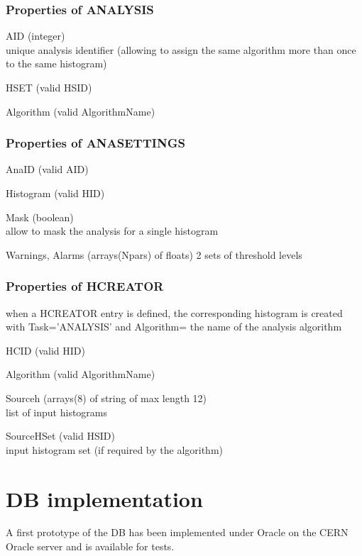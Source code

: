 \documentclass{lhcbnote}
\begin{document}
\subsubsection{Properties of ANALYSIS}
\begin{description}
\item{AID} (integer)\\
unique analysis identifier (allowing to assign the same algorithm more
than once to the same histogram)
\item{HSET}  (valid HSID)
\item{Algorithm}  (valid AlgorithmName)
\end{description}

\subsubsection{Properties of ANASETTINGS}
\begin{description}
\item{AnaID} (valid AID)
\item{Histogram}  (valid HID)
\item{Mask} (boolean)\\
allow to mask the analysis for a single histogram
\item{Warnings, Alarms} (arrays(Npars) of floats)
2 sets of threshold levels
\end{description}

\subsubsection{Properties of HCREATOR}
when a HCREATOR entry is defined, the corresponding histogram is
created with Task='ANALYSIS' and Algorithm= the name of the analysis algorithm
\begin{description}
\item{HCID} (valid HID)
\item{Algorithm} (valid AlgorithmName)
\item{Sourceh} (arrays(8) of string of max length 12)\\
list of input histograms
\item{SourceHSet} (valid HSID)\\
input histogram set (if required by the algorithm)
\end{description}

\section{DB implementation}
A first prototype of the DB has been implemented under Oracle on the
CERN Oracle server and is available for tests.
\end{document}
